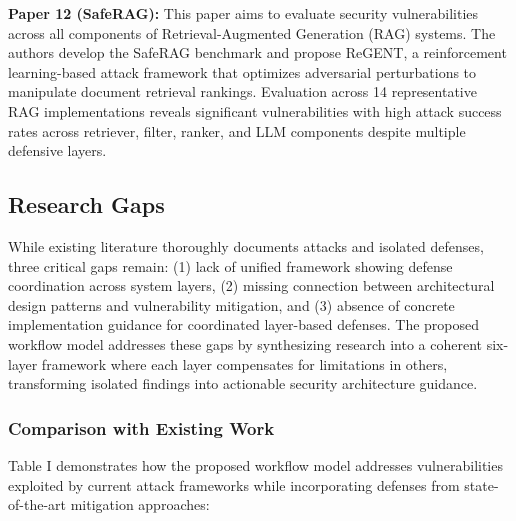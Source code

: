 \documentclass[conference]{IEEEtran}
\begin{document}
\textbf{Paper 12 (SafeRAG):} This paper aims to evaluate security vulnerabilities across all components of Retrieval-Augmented Generation (RAG) systems. The authors develop the SafeRAG benchmark and propose ReGENT, a reinforcement learning-based attack framework that optimizes adversarial perturbations to manipulate document retrieval rankings. Evaluation across 14 representative RAG implementations reveals significant vulnerabilities with high attack success rates across retriever, filter, ranker, and LLM components despite multiple defensive layers.

\subsection{Research Gaps}
While existing literature thoroughly documents attacks and isolated defenses, three critical gaps remain: (1) lack of unified framework showing defense coordination across system layers, (2) missing connection between architectural design patterns and vulnerability mitigation, and (3) absence of concrete implementation guidance for coordinated layer-based defenses. The proposed workflow model addresses these gaps by synthesizing research into a coherent six-layer framework where each layer compensates for limitations in others, transforming isolated findings into actionable security architecture guidance.

\subsubsection{Comparison with Existing Work}
Table I demonstrates how the proposed workflow model addresses vulnerabilities exploited by current attack frameworks while incorporating defenses from state-of-the-art mitigation approaches:
\end{document}
